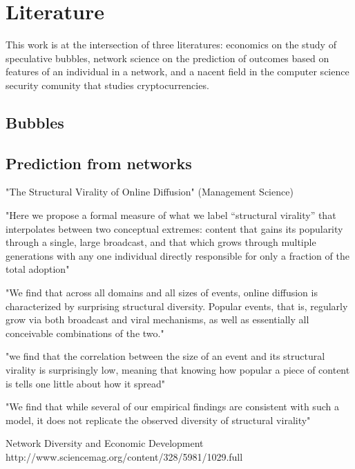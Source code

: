 \section{Literature}

This work is at the intersection of three literatures: economics on the study of speculative bubbles, network science on the prediction of outcomes based on features of an individual in a network, and a nacent field in the computer science security comunity that studies cryptocurrencies. 

\subsection{Bubbles}

\subsection{Prediction from networks}


"The Structural Virality of Online Diffusion" (Management Science)




"Here we propose a formal measure of what we label “structural virality” that interpolates between two conceptual extremes: content that gains its popularity through a single, large broadcast, and that which grows through multiple generations with any one individual directly responsible for only a fraction of the total adoption"

"We find that across all domains and all sizes of events, online diffusion is characterized by surprising structural diversity. Popular events, that is, regularly grow via both broadcast and viral mechanisms, as well as essentially all conceivable combinations of the two."

"we find that the correlation between the size of an event and its structural virality is surprisingly low, meaning that knowing how popular a piece of content is tells one little about how it spread"

"We find that while several of our empirical findings are consistent with such a model, it does not replicate the observed diversity of structural virality"











Network Diversity and Economic Development
http://www.sciencemag.org/content/328/5981/1029.full



